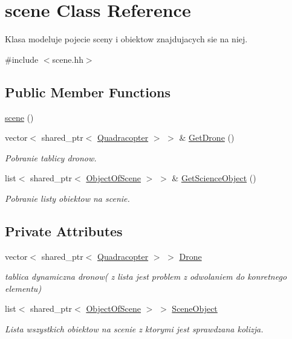 \hypertarget{classscene}{}\section{scene Class Reference}
\label{classscene}


Klasa modeluje pojecie sceny i obiektow znajdujacych sie na niej.  




{\ttfamily \#include $<$scene.\+hh$>$}

\subsection*{Public Member Functions}
\begin{DoxyCompactItemize}
\item 
\hyperlink{classscene_a31beecfc650064406d6142d8bb81236d}{scene} ()
\item 
vector$<$ shared\+\_\+ptr$<$ \hyperlink{class_quadracopter}{Quadracopter} $>$ $>$ \& \hyperlink{classscene_ad20f1f57cc34e799e12a507282a2fe40}{Get\+Drone} ()
\begin{DoxyCompactList}\small\item\em Pobranie tablicy dronow. \end{DoxyCompactList}\item 
list$<$ shared\+\_\+ptr$<$ \hyperlink{class_object_of_scene}{Object\+Of\+Scene} $>$ $>$ \& \hyperlink{classscene_a9e1bc92a004913c3485e6b6c34c60569}{Get\+Science\+Object} ()
\begin{DoxyCompactList}\small\item\em Pobranie listy obiektow na scenie. \end{DoxyCompactList}\end{DoxyCompactItemize}
\subsection*{Private Attributes}
\begin{DoxyCompactItemize}
\item 
vector$<$ shared\+\_\+ptr$<$ \hyperlink{class_quadracopter}{Quadracopter} $>$ $>$ \hyperlink{classscene_a3798bb3e6e4813c381a6934bb264ddcc}{Drone}
\begin{DoxyCompactList}\small\item\em tablica dynamiczna dronow( z lista jest problem z odwolaniem do konretnego elementu) \end{DoxyCompactList}\item 
list$<$ shared\+\_\+ptr$<$ \hyperlink{class_object_of_scene}{Object\+Of\+Scene} $>$ $>$ \hyperlink{classscene_a5adf71e0375b90603aa75148c2927ecb}{Scene\+Object}
\begin{DoxyCompactList}\small\item\em Lista wszystkich obiektow na scenie z ktorymi jest sprawdzana kolizja. \end{DoxyCompactList}\end{DoxyCompactItemize}



